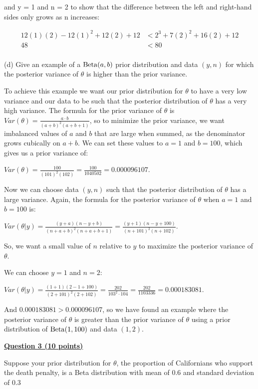 \documentclass[12pt]{article}
\begin{document}
and y = 1 and n = 2 to show that the difference between the left and right-hand sides only grows as n increases:

\begin{align*}
12(1)(2) - 12(1)^2 + 12(2) + 12 &< 2^3 + 7(2)^2 + 16(2) + 12 \\
48 &< 80 \\
\end{align*}


(d) Give an example of a ${\rm Beta}(a, b)$ prior distribution and data $(y,n)$ for which the posterior
variance of $\theta$ is higher than the prior variance.

To achieve this example we want our prior distribution for $\theta$ to have a very low variance
and our data to be such that the posterior distribution of $\theta$ has a very high variance. The formula for the
prior variance of $\theta$ is $Var(\theta) = \frac{a \cdot b}{(a + b)^2(a + b + 1)}$, so to minimize the prior variance,
we want imbalanced values of $a$ and $b$ that are large when summed, as the denominator grows cubically
on $a + b$. We can set these values to $a = 1$ and $b = 100$, which gives us a prior variance of:

$Var(\theta) = \frac{100}{(101)^2(102)} = \frac{100}{1040502} = 0.000096107$.

Now we can choose data $(y,n)$ such that the posterior distribution of $\theta$ has a large variance. Again, the formula
for the posterior variance of $\theta$ when $a = 1$ and $b = 100$ is:

$Var(\theta | y) = \frac{(y + a)(n - y + b)}{(n + a + b)^2(n + a + b + 1)} = \frac{(y + 1)(n - y + 100)}{(n + 101)^2(n + 102)}$.

So, we want a small value of $n$ relative to $y$ to maximize the posterior variance of $\theta$. 

We can choose $y = 1$ and $n = 2$:

$Var(\theta | y) = \frac{(1 + 1)(2 - 1 + 100)}{(2 + 101)^2(2 + 102)} = \frac{202}{103^2 \cdot 104} = \frac{202}{1103336} = 0.000183081$.

And $0.000183081 > 0.000096107$, so we have found an example where the posterior variance of $\theta$ is greater than the prior
variance of $\theta$ using a prior distribution of ${\rm Beta}(1, 100)$ and data $(1, 2)$.

\bigskip

{\underline{\bf Question 3 (10 points)}}  

Suppose your prior distribution for $\theta$, the proportion of Californians who support the death penalty, is a Beta distribution with mean of 0.6 and standard deviation of 0.3
\end{document}
